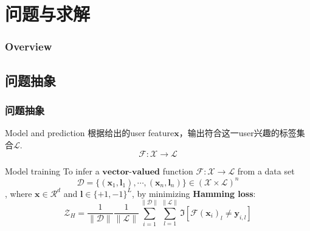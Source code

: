 \documentclass{beamer}
\begin{document}
\section{问题与求解}

\begin{frame}
\frametitle{Overview} %
\tableofcontents[currentsection] %
\end{frame}

\subsection{问题抽象}

\begin{frame}
\frametitle{问题抽象}
\begin{block}{Model and prediction}
根据给出的user feature$\mathbf{x}$，输出符合这一user兴趣的标签集合$\mathcal{L}$.
$$\mathcal{F} : \mathcal{X} \rightarrow \mathcal{L}$$
\end{block}

\pause

\begin{block}{Model training}
To infer a $\textbf{vector-valued}$ function $\mathcal{F} : \mathcal{X} \rightarrow \mathcal{L}$ from a data set
$$\mathcal{D} = \{({\mathbf{x}}_1, {\mathbf{l}}_1), \cdots, ({\mathbf{x}}_n, {\mathbf{l}}_n)\} \in (\mathcal{X} \times \mathcal{L})^n$$
, where $\mathbf{x} \in \mathcal{R}^d$ and $\mathbf{l} \in {\{+1,-1\}}^L$, by minimizing \textbf{Hamming loss}:
$$\mathcal{Z}_{H} = \frac{1}{\|\mathcal{D}\|} \frac{1}{\|\mathcal{L}\|} \sum_{i=1}^{\|\mathcal{D}\|} \sum_{l=1}^{\|\mathcal{L}\|} \mathfrak{I} [ \mathcal{F}(\mathbf{x}_i)_l \neq \mathbf{y}_{i,l} ]$$
\end{block}
\end{frame}
\end{document}

